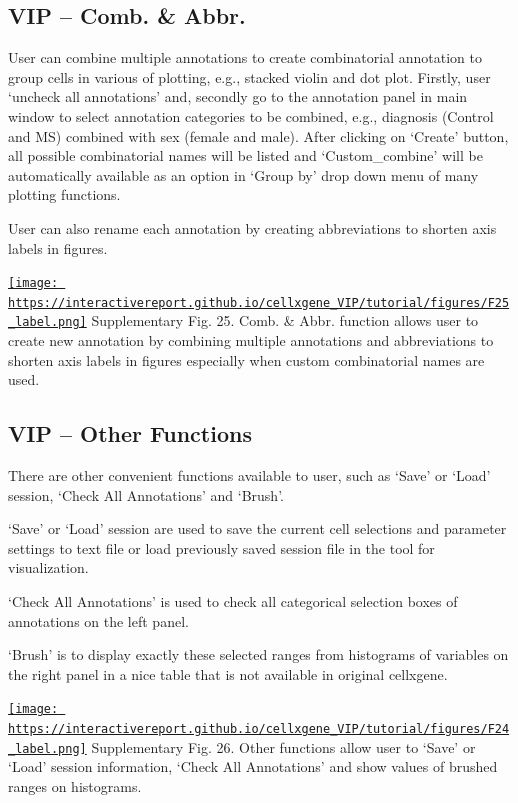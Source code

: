 \documentclass[
]{article}
\begin{document}
\hypertarget{vip-comb.-abbr.}{%
\subsection{VIP -- Comb. \& Abbr.}\label{vip-comb.-abbr.}}

User can combine multiple annotations to create combinatorial annotation to group cells in various of plotting, e.g., stacked violin and dot plot. Firstly, user `uncheck all annotations' and, secondly go to the annotation panel in main window to select annotation categories to be combined, e.g., diagnosis (Control and MS) combined with sex (female and male). After clicking on `Create' button, all possible combinatorial names will be listed and `Custom\_combine' will be automatically available as an option in `Group by' drop down menu of many plotting functions.

User can also rename each annotation by creating abbreviations to shorten axis labels in figures.

\href{https://interactivereport.github.io/cellxgene_VIP/tutorial/figures/F25_label.png}{\texttt{[image: https://interactivereport.github.io/cellxgene\_VIP/tutorial/figures/F25\_label.png]}}
Supplementary Fig. 25. Comb. \& Abbr. function allows user to create new annotation by combining multiple annotations and abbreviations to shorten axis labels in figures especially when custom combinatorial names are used.

\hypertarget{vip-other-functions}{%
\subsection{VIP -- Other Functions}\label{vip-other-functions}}

There are other convenient functions available to user, such as `Save' or `Load' session, `Check All Annotations' and `Brush'.

`Save' or `Load' session are used to save the current cell selections and parameter settings to text file or load previously saved session file in the tool for visualization.

`Check All Annotations' is used to check all categorical selection boxes of annotations on the left panel.

`Brush' is to display exactly these selected ranges from histograms of variables on the right panel in a nice table that is not available in original cellxgene.

\href{https://interactivereport.github.io/cellxgene_VIP/tutorial/figures/F24_label.png}{\texttt{[image: https://interactivereport.github.io/cellxgene\_VIP/tutorial/figures/F24\_label.png]}}
Supplementary Fig. 26. Other functions allow user to `Save' or `Load' session information, `Check All Annotations' and show values of brushed ranges on histograms.
\end{document}
